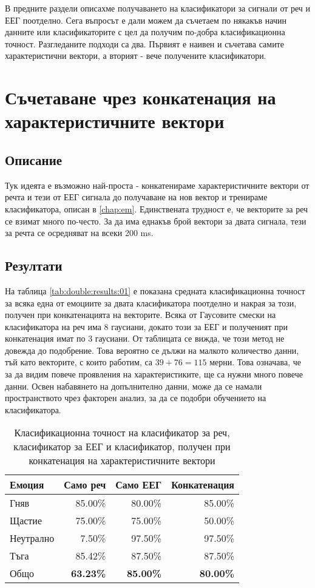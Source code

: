 \documentclass[main.tex]{subfiles}
\begin{document}
В предните раздели описахме получаването на класификатори за сигнали от реч и ЕЕГ поотделно. Сега въпросът е дали можем да съчетаем по някакъв начин данните или класификаторите с цел да получим по-добра класификационна точност. Разгледаните подходи са два. Първият е наивен и съчетава самите характеристични вектори, а вторият - вече получените класификатори. 

\section{Съчетаване чрез конкатенация на характеристичните вектори}
\subsection{Описание}
Тук идеята е възможно най-проста - конкатенираме характеристичните вектори от речта и тези от ЕЕГ сигнала до получаване на нов вектор и тренираме класификатора, описан в \autoref{chap:em}. Единствената трудност е, че векторите за реч се взимат много по-често. За да има еднакъв брой вектори за двата сигнала, тези за речта се осредняват на всеки 200 ms.
\subsection{Резултати}
На таблица \autoref{tab:double:results:01} е показана средната класификационна точност за всяка една от емоциите за двата класификатора поотделно и накрая за този, получен при конкатенацията на векторите. Всяка от Гаусовите смески на класификатора на реч има 8 гаусиани, докато този за ЕЕГ и полученият при конкатенация имат по 3 гаусиани. От таблицата се вижда, че този метод не довежда до подобрение. Това вероятно се дължи на малкото количество данни, тъй като векторите, с които работим, са $39 + 76 = 115$ мерни. Това означава, че за да видим повече проявления на характеристиките, ще са нужни много повече данни. Освен набавянето на допълнително данни, може да се намали пространството чрез факторен анализ, за да се подобри обучението на класификатора.

\begin{table}[h]
    \begin{center}
    \begin{tabular}{|l|r r r|} 
        \hline
        Емоция & Само реч & Само ЕЕГ & Конкатенация \\ 
        \hline
        Гняв & 85.00\% & 80.00\% & 85.00\%\\ 
        Щастие & 75.00\% & 75.00\% & 50.00\%\\ 
        Неутрално & 7.50\% & 97.50\% & 97.50\%\\ 
        Тъга & 85.42\% & 87.50\% & 87.50\%\\ 
        \hline
        \hline
        Общо & \textbf{63.23\%} & \textbf{85.00\%} &  \textbf{80.00\%}\\
        \hline
    \end{tabular}
    \caption{Класификационна точност на класификатор за реч, класификатор за ЕЕГ и класификатор, получен при конкатенация на характеристичните вектори}
    \label{tab:double:results:01}
    \end{center}
\end{table}
\end{document}
